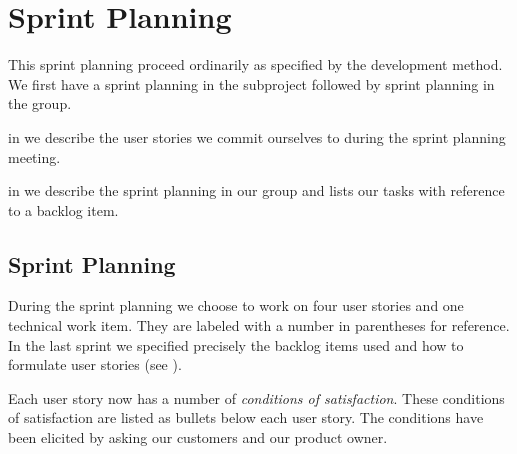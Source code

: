 \chapter{Sprint Planning}\label{chap:s4_sprintplanning}
This sprint planning proceed ordinarily as specified by the development method. We first have a sprint planning in the subproject followed by sprint planning in the group.

\begin{chapterorganization}
  \item in  we describe the user stories we commit ourselves to during the \bd sprint planning meeting.
  \item in  we describe the sprint planning in our group and lists our tasks with reference to a backlog item.
\end{chapterorganization}

\section{\bdtitle Sprint Planning}\label{sec:S4_bd}
During the \bd sprint planning we choose to work on four user stories and one technical work item. They are labeled with a number in parentheses for reference. In the last sprint we specified precisely the backlog items used and how to formulate user stories (see ).

Each user story now has a number of \emph{conditions of satisfaction}. These conditions of satisfaction are listed as bullets below each user story. The conditions have been elicited by asking our customers and our product owner.

